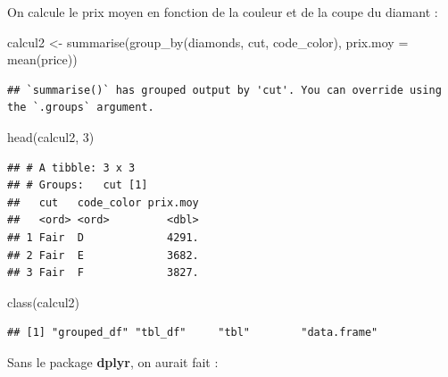 \documentclass[
]{book}
\newenvironment{Shaded}{\begin{snugshade}}{\end{snugshade}}
\newcommand{\AttributeTok}[1]{\textcolor[rgb]{0.77,0.63,0.00}{#1}}
\newcommand{\DecValTok}[1]{\textcolor[rgb]{0.00,0.00,0.81}{#1}}
\newcommand{\FunctionTok}[1]{\textcolor[rgb]{0.00,0.00,0.00}{#1}}
\newcommand{\NormalTok}[1]{#1}
\newcommand{\OtherTok}[1]{\textcolor[rgb]{0.56,0.35,0.01}{#1}}
\newcommand{\SpecialCharTok}[1]{\textcolor[rgb]{0.00,0.00,0.00}{#1}}
\newcommand{\StringTok}[1]{\textcolor[rgb]{0.31,0.60,0.02}{#1}}
\theoremstyle{definition}
\theoremstyle{definition}
\theoremstyle{definition}
\theoremstyle{definition}
\theoremstyle{remark}
\begin{document}
On calcule le prix moyen en fonction de la couleur et de la coupe du diamant :

\begin{Shaded}
\begin{Highlighting}[]
\NormalTok{calcul2 }\OtherTok{\textless{}{-}} \FunctionTok{summarise}\NormalTok{(}\FunctionTok{group\_by}\NormalTok{(diamonds, cut, code\_color), }\AttributeTok{prix.moy =} \FunctionTok{mean}\NormalTok{(price))}
\end{Highlighting}
\end{Shaded}

\begin{verbatim}
## `summarise()` has grouped output by 'cut'. You can override using the `.groups` argument.
\end{verbatim}

\begin{Shaded}
\begin{Highlighting}[]
\FunctionTok{head}\NormalTok{(calcul2, }\DecValTok{3}\NormalTok{)}
\end{Highlighting}
\end{Shaded}

\begin{verbatim}
## # A tibble: 3 x 3
## # Groups:   cut [1]
##   cut   code_color prix.moy
##   <ord> <ord>         <dbl>
## 1 Fair  D             4291.
## 2 Fair  E             3682.
## 3 Fair  F             3827.
\end{verbatim}

\begin{Shaded}
\begin{Highlighting}[]
\FunctionTok{class}\NormalTok{(calcul2)}
\end{Highlighting}
\end{Shaded}

\begin{verbatim}
## [1] "grouped_df" "tbl_df"     "tbl"        "data.frame"
\end{verbatim}

Sans le package \textbf{dplyr}, on aurait fait :

\begin{Shaded}
\end{Shaded}
\end{document}
